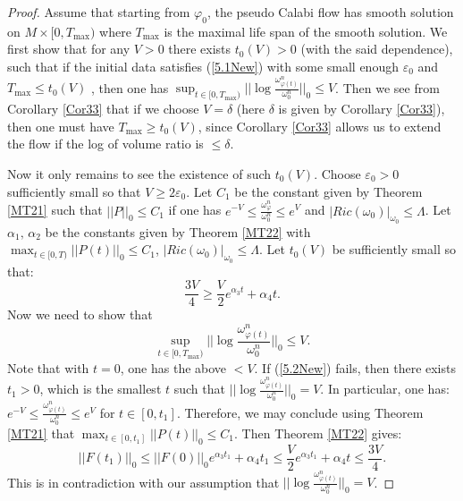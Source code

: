 \documentclass[11pt]{amsart}
\numberwithin{equation}{section}
\newcommand \eps{\varepsilon}
\begin{document}
\begin{proof}
Assume that starting from $\varphi_0$,  the pseudo Calabi flow has smooth solution on $M\times [0,T_{\max})$ where $T_{\max}$ is the maximal life span of the smooth solution.  We first show that for any $V>0$ there exists $t_0(V)>0$ (with the said dependence),    such that if the initial data satisfies (\ref{5.1New}) with some small enough $\eps_0$ and  $T_{\max}\le t_0(V)$ ,  then one has $\sup_{t\in [0,T_{\max})}||\log\frac{\omega_{\varphi(t)}^n}{\omega_0^n}||_0\le V$.  Then we see from Corollary \ref{Cor33} that if we choose $V= \delta$ (here $\delta$ is given by Corollary \ref{Cor33}),  then one must have $T_{\max}\ge t_0(V)$,  since Corollary \ref{Cor33} allows us to extend the flow if the log of volume ratio is $\le \delta$.

Now it only remains to see the existence of such $t_0(V)$.  Choose $\eps_0>0$ sufficiently small so that $V\ge 2\eps_0$.  Let $C_1$ be the constant given by Theorem \ref{MT21} such that $||P||_0\le C_1$ if one has $e^{-V}\le \frac{\omega_{\varphi}^n}{\omega_0^n}\le e^V$ and $|Ric(\omega_0)|_{\omega_0}\le \Lambda$.  Let $\alpha_1,\,\alpha_2$ be the constants given by Theorem \ref{MT22} with $\max_{t\in [0,T)}||P(t)||_0\le C_1$,  $|Ric(\omega_0)|_{\omega_0}\le \Lambda$.  Let $t_0(V)$ be sufficiently small so that:
\begin{equation*}
\frac{3V}{4}\ge \frac{V}{2}e^{\alpha_3t}+\alpha_4t.
\end{equation*}
Now we need to show that 
\begin{equation}\label{5.2New}
\sup_{t\in [0,T_{\max})}||\log\frac{\omega_{\varphi(t)}^n}{\omega_0^n}||_0\le V.
\end{equation}
Note that with $t=0$,  one has the above $<V$.  If (\ref{5.2New}) fails,  then there exists $t_1>0$,  which is the smallest $t$ such that $||\log\frac{\omega_{\varphi(t)}^n}{\omega_0^n}||_0=V.$  In particular,  one has: $e^{-V}\le \frac{\omega_{\varphi(t)}^n}{\omega_0^n}\le e^V$ for $t\in [0,t_1]$.  Therefore,  we may conclude using Theorem \ref{MT21} that $\max_{t\in[0,t_1]}||P(t)||_0\le C_1$.  Then Theorem \ref{MT22} gives:
\begin{equation*}
||F(t_1)||_0\le ||F(0)||_0e^{\alpha_3t_1}+\alpha_4t_1\le \frac{V}{2}e^{\alpha_3t_1}+\alpha_4t\le \frac{3V}{4}.
\end{equation*}
This is in contradiction with our assumption that $||\log\frac{\omega_{\varphi(t)}^n}{\omega_0^n}||_0=V$.
\end{proof}
\end{document}
